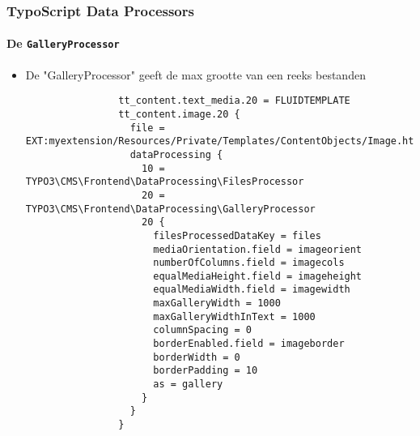 \begin{frame}[fragile]
	\frametitle{TypoScript Data Processors}
	\framesubtitle{De \texttt{GalleryProcessor}}

	\lstset{basicstyle=\tiny\ttfamily}

	\begin{itemize}


		\item De "GalleryProcessor" geeft de max grootte van een reeks bestanden

			\begin{lstlisting}
				tt_content.text_media.20 = FLUIDTEMPLATE
				tt_content.image.20 {
				  file = EXT:myextension/Resources/Private/Templates/ContentObjects/Image.html
				  dataProcessing {
				    10 = TYPO3\CMS\Frontend\DataProcessing\FilesProcessor
				    20 = TYPO3\CMS\Frontend\DataProcessing\GalleryProcessor
				    20 {
				      filesProcessedDataKey = files
				      mediaOrientation.field = imageorient
				      numberOfColumns.field = imagecols
				      equalMediaHeight.field = imageheight
				      equalMediaWidth.field = imagewidth
				      maxGalleryWidth = 1000
				      maxGalleryWidthInText = 1000
				      columnSpacing = 0
				      borderEnabled.field = imageborder
				      borderWidth = 0
				      borderPadding = 10
				      as = gallery
				    }
				  }
				}
			\end{lstlisting}

	\end{itemize}

\end{frame}


